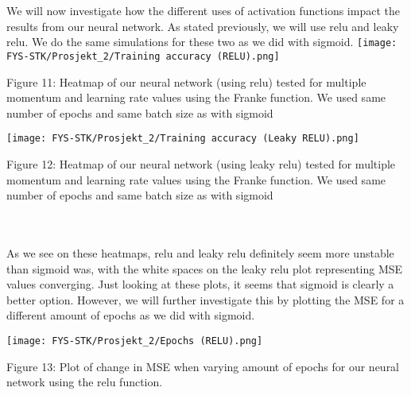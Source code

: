 \documentclass[english,notitlepage,reprint,nofootinbib]{revtex4-1}  %
\begin{document}
\\
\\
We will now investigate how the different uses of activation functions impact the results from our neural network. As stated previously, we will use relu and leaky relu. We do the same simulations for these two as we did with sigmoid.
\texttt{[image: FYS-STK/Prosjekt\_2/Training accuracy (RELU).png]}
\caption{Figure 11: Heatmap of our neural network (using relu) tested for multiple momentum and learning rate values using the Franke function. We used same number of epochs and same batch size as with sigmoid}

\texttt{[image: FYS-STK/Prosjekt\_2/Training accuracy (Leaky RELU).png]}
\caption{Figure 12: Heatmap of our neural network (using leaky relu) tested for multiple momentum and learning rate values using the Franke function. We used same number of epochs and same batch size as with sigmoid}
\\
\\
As we see on these heatmaps, relu and leaky relu definitely seem more unstable than sigmoid was, with the white spaces on the leaky relu plot representing MSE values converging. Just looking at these plots, it seems that sigmoid is clearly a better option. However, we will further investigate this by plotting the MSE for a different amount of epochs as we did with sigmoid. 

\texttt{[image: FYS-STK/Prosjekt\_2/Epochs (RELU).png]}
\caption{Figure 13: Plot of change in MSE when varying amount of epochs for our neural network using the relu function.}
\end{document}
